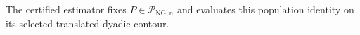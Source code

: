 The certified estimator fixes \(P\in\mathcal P_{\mathrm{NG},n}\) and evaluates this population identity on its selected translated-dyadic contour.